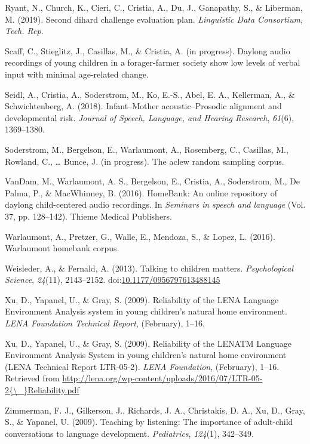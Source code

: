 \documentclass[english,floatsintext,man]{apa6}
\begin{document}
\hypertarget{ref-ryant2019second}{}
Ryant, N., Church, K., Cieri, C., Cristia, A., Du, J., Ganapathy, S., \&
Liberman, M. (2019). Second dihard challenge evaluation plan.
\emph{Linguistic Data Consortium, Tech. Rep}.

\hypertarget{ref-scaff}{}
Scaff, C., Stieglitz, J., Casillas, M., \& Cristia, A. (in progress).
Daylong audio recordings of young children in a forager-farmer society
show low levels of verbal input with minimal age-related change.

\hypertarget{ref-Seidl2018}{}
Seidl, A., Cristia, A., Soderstrom, M., Ko, E.-S., Abel, E. A.,
Kellerman, A., \& Schwichtenberg, A. (2018). Infant--Mother
acoustic--Prosodic alignment and developmental risk. \emph{Journal of
Speech, Language, and Hearing Research}, \emph{61}(6), 1369--1380.

\hypertarget{ref-soderstrom}{}
Soderstrom, M., Bergelson, E., Warlaumont, A., Rosemberg, C., Casillas,
M., Rowland, C., \ldots{} Bunce, J. (in progress). The aclew random
sampling corpus.

\hypertarget{ref-vandam2016homebank}{}
VanDam, M., Warlaumont, A. S., Bergelson, E., Cristia, A., Soderstrom,
M., De Palma, P., \& MacWhinney, B. (2016). HomeBank: An online
repository of daylong child-centered audio recordings. In \emph{Seminars
in speech and language} (Vol. 37, pp. 128--142). Thieme Medical
Publishers.

\hypertarget{ref-warlaumont2016warlaumont}{}
Warlaumont, A., Pretzer, G., Walle, E., Mendoza, S., \& Lopez, L.
(2016). Warlaumont homebank corpus.

\hypertarget{ref-Weisleder2013a}{}
Weisleder, A., \& Fernald, A. (2013). Talking to children matters.
\emph{Psychological Science}, \emph{24}(11), 2143--2152.
doi:\href{https://doi.org/10.1177/0956797613488145}{10.1177/0956797613488145}

\hypertarget{ref-Xu2009}{}
Xu, D., Yapanel, U., \& Gray, S. (2009). Reliability of the LENA
Language Environment Analysis system in young children's natural home
environment. \emph{LENA Foundation Technical Report}, (February), 1--16.

\hypertarget{ref-Xu2009a}{}
Xu, D., Yapanel, U., \& Gray, S. (2009). Reliability of the LENATM
Language Environment Analysis System in young children's natural home
environment (LENA Technical Report LTR-05-2). \emph{LENA Foundation},
(February), 1--16. Retrieved from
\href{http://lena.org/wp-content/uploads/2016/07/LTR-05-2\%7B/_\%7DReliability.pdf}{http://lena.org/wp-content/uploads/2016/07/LTR-05-2\{\textbackslash{}\_\}Reliability.pdf}

\hypertarget{ref-zimmerman2009}{}
Zimmerman, F. J., Gilkerson, J., Richards, J. A., Christakis, D. A., Xu,
D., Gray, S., \& Yapanel, U. (2009). Teaching by listening: The
importance of adult-child conversations to language development.
\emph{Pediatrics}, \emph{124}(1), 342--349.
\end{document}
